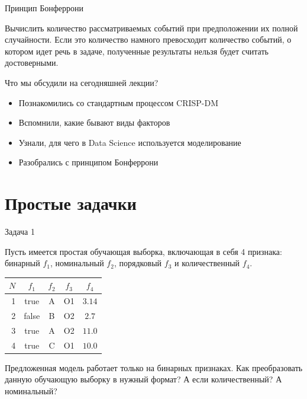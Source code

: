 \documentclass[10pt,a4paper]{beamer}
\begin{document}

\begin{frame}{Принцип Бонферрони}

Вычислить количество рассматриваемых событий при предположении их полной случайности. Если это количество намного превосходит количество событий, о котором идет речь в задаче, полученные результаты нельзя будет считать достоверными.

\end{frame}


\begin{frame}{Что мы обсудили на сегодняшней лекции?}

\begin{itemize}
\item Познакомились со стандартным процессом CRISP-DM
\item Вспомнили, какие бывают виды факторов
\item Узнали, для чего в Data Science используется моделирование
\item Разобрались с принципом Бонферрони
\end{itemize}

\end{frame}


\section{Простые задачки}

\begin{frame}{Задача 1}

Пусть имеется простая обучающая выборка, включающая в себя 4 признака: бинарный $f_1$, номинальный $f_2$, порядковый $f_3$ и количественный $f_4$.

\begin{center}
\begin{tabular}{| r | c | c | c | c |}
\hline
\bf $N$ & \bf $f_1$ & \bf $f_2$ & \bf $f_3$ & \bf $f_4$ \\
\hline
\hline
1 & true & A & O1 & $3.14$ \\
2 & false & B & O2 & $2.7$ \\
3 & true & A & O2 & $11.0$ \\
4 & true & C & O1 & $10.0$ \\
\hline
\end{tabular}
\end{center}
Предложенная модель работает только на бинарных признаках. Как преобразовать данную обучающую выборку в нужный формат? А если количественный? А номинальный?

\end{frame}
\end{document}
